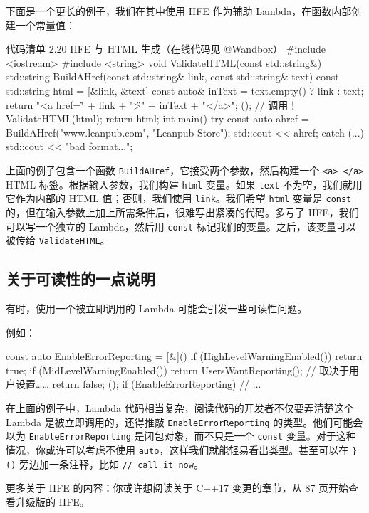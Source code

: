 \begin{codebox}
下面是一个更长的例子，我们在其中使用 IIFE 作为辅助 Lambda，在函数内部创建一个常量值：

\begin{codeboxt}{代码清单 2.20 IIFE 与 HTML 生成（在线代码见 @Wandbox）}
#include <iostream>
#include <string>
void ValidateHTML(const std::string&) { }
std::string BuildAHref(const std::string& link, const std::string& text) {
const std::string html = [&link, &text] {
const auto& inText = text.empty() ? link : text;
return "<a href=\"" + link + "\">" + inText + "</a>";
}(); // 调用！
ValidateHTML(html);
return html;
}
int main() {
try {
const auto ahref = BuildAHref("www.leanpub.com", "Leanpub Store");
std::cout << ahref;
}
catch (...) {
std::cout << "bad format...";
}
}
\end{codeboxt}

上面的例子包含一个函数 \texttt{BuildAHref}，它接受两个参数，然后构建一个 \texttt{<a> </a>} HTML 标签。根据输入参数，我们构建 \texttt{html} 变量。如果 \texttt{text} 不为空，我们就用它作为内部的 HTML 值；否则，我们使用 \texttt{link}。我们希望 \texttt{html} 变量是 \texttt{const} 的，但在输入参数上加上所需条件后，很难写出紧凑的代码。多亏了 IIFE，我们可以写一个独立的 Lambda，然后用 \texttt{const} 标记我们的变量。之后，该变量可以被传给 \texttt{ValidateHTML}。

\subsection{关于可读性的一点说明}

有时，使用一个被立即调用的 Lambda 可能会引发一些可读性问题。

例如：

\begin{codebox}
const auto EnableErrorReporting = [&]() {
if (HighLevelWarningEnabled())
return true;
if (MidLevelWarningEnabled())
return UsersWantReporting(); // 取决于用户设置……
return false;
}();
if (EnableErrorReporting) {
// ...
}
\end{codebox}

在上面的例子中，Lambda 代码相当复杂，阅读代码的开发者不仅要弄清楚这个 Lambda 是被立即调用的，还得推敲 \texttt{EnableErrorReporting} 的类型。他们可能会以为 \texttt{EnableErrorReporting} 是闭包对象，而不只是一个 \texttt{const} 变量。对于这种情况，你或许可以考虑不使用 \texttt{auto}，这样我们就能轻易看出类型。甚至可以在 \texttt{\}()} 旁边加一条注释，比如 \texttt{// call it now}。


更多关于 IIFE 的内容：你或许想阅读关于 C++17 变更的章节，从 87 页开始查看升级版的 IIFE。


\end{codebox}
